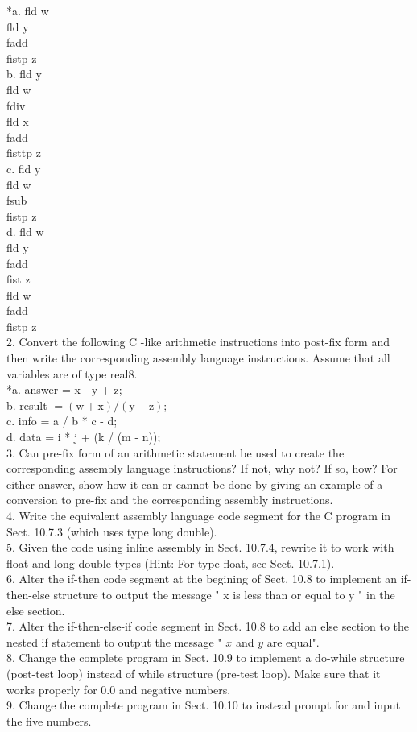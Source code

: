 \documentclass[10pt]{book}
\begin{document}
*a. fld w\\
fld y\\
fadd\\
fistp z\\
b. fld y\\
fld w\\
fdiv\\
fld x\\
fadd\\
fisttp z\\
c. fld y\\
fld w\\
fsub\\
fistp z\\
d. fld w\\
fld y\\
fadd\\
fist z\\
fld w\\
fadd\\
fistp z\\
2. Convert the following C -like arithmetic instructions into post-fix form and then write the corresponding assembly language instructions. Assume that all variables are of type real8.\\
*a. answer = x - y + z;\\
b. result $=(\mathrm{w}+\mathrm{x}) /(\mathrm{y}-\mathrm{z})$;\\
c. info = a / b * c - d;\\
d. data = i * j + (k / (m - n));\\
3. Can pre-fix form of an arithmetic statement be used to create the corresponding assembly language instructions? If not, why not? If so, how? For either answer, show how it can or cannot be done by giving an example of a conversion to pre-fix and the corresponding assembly instructions.\\
4. Write the equivalent assembly language code segment for the C program in Sect. 10.7.3 (which uses type long double).\\
5. Given the code using inline assembly in Sect. 10.7.4, rewrite it to work with float and long double types (Hint: For type float, see Sect. 10.7.1).\\
6. Alter the if-then code segment at the begining of Sect. 10.8 to implement an if-then-else structure to output the message " x is less than or equal to y " in the else section.\\
7. Alter the if-then-else-if code segment in Sect. 10.8 to add an else section to the nested if statement to output the message " $x$ and $y$ are equal".\\
8. Change the complete program in Sect. 10.9 to implement a do-while structure (post-test loop) instead of while structure (pre-test loop). Make sure that it works properly for 0.0 and negative numbers.\\
9. Change the complete program in Sect. 10.10 to instead prompt for and input the five numbers.
\end{document}
